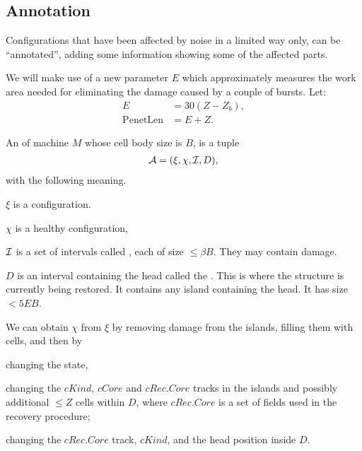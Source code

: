 \documentclass[12pt]{memoir}
\newcommand{\fld}[1]{\ensuremath{\textit{#1}}}
\def\B{B}
\newcommand{\D}{D}
\newcommand{\E}{E}
\newcommand{\PenetrationLen}{\mathrm{PenetLen}}
\newcommand{\Z}{Z}
\newcommand{\Core}{\fld{Core}}
\newcommand{\cCore}{\fld{cCore}}
\newcommand{\cKind}{\fld{cKind}}
\newcommand{\cRec}{\fld{cRec}}
\begin{document}
\subsection{Annotation}

Configurations that have been affected by noise in a limited way only, can be ``annotated'',
adding some information showing some of the affected parts. 


We will make use of a new parameter \( \E \) which approximately measures the work 
area needed for eliminating the damage caused by a couple of bursts.
Let:
\begin{align}\label{eq:Expansion}
   \E  &= 30(\Z-\Z_{b}), %
\\   \PenetrationLen &= \E+\Z.
 \end{align}


\begin{definition}\label{def:annotated-config}
    An  of machine \( M \) whose cell body size is \( \B \),
    is a tuple
         \begin{align*}
             \cA=(\xi,\chi, \cI, \D),
         \end{align*}
    with the following meaning.

    \( \xi \) is a configuration.

    \( \chi \) is a healthy configuration, %

    \( \mathcal{I} \) is a set of intervals called , each of size \( \le\beta\B \).  %
    They may contain damage.

    \( \D \) is an interval containing the head called the .
    This is where the structure is currently being restored.
    It contains any island containing the head.
    It has size \( <5\E\B \). %

    We can obtain \( \chi \) from \( \xi \) by removing damage from the islands,
    filling them with cells, and then by
    \begin{bullets}
         \item changing the state,
         \item changing the \( \cKind \), \( \cCore \)  and \( \cRec.\Core \) tracks
               in the islands and possibly
               additional \( \le \Z \) cells within \( \D \), where
               \( \cRec.\Core \) is a set of fields used in the recovery
               procedure;
         \item changing the \( \cRec.\Core \) track,  \( \cKind \),
           and the head position inside \( \D \).
    \end{bullets}



\end{definition}
\end{document}
